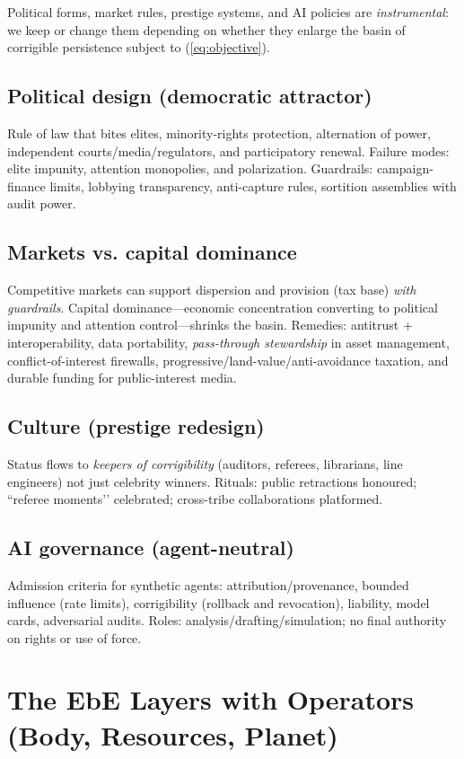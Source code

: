 \documentclass[11pt,a4paper]{article}
\begin{document}
Political forms, market rules, prestige systems, and AI policies are \emph{instrumental}: we keep or change them depending on whether they enlarge the basin of corrigible persistence subject to (\ref{eq:objective}).

\subsection*{Political design (democratic attractor)}
Rule of law that bites elites, minority-rights protection, alternation of power, independent courts/media/regulators, and participatory renewal. Failure modes: elite impunity, attention monopolies, and polarization. Guardrails: campaign-finance limits, lobbying transparency, anti-capture rules, sortition assemblies with audit power.

\subsection*{Markets vs. capital dominance}
Competitive markets can support dispersion and provision (tax base) \emph{with guardrails}. Capital dominance---economic concentration converting to political impunity and attention control---shrinks the basin. Remedies: antitrust + interoperability, data portability, \emph{pass-through stewardship} in asset management, conflict-of-interest firewalls, progressive/land-value/anti-avoidance taxation, and durable funding for public-interest media.

\subsection*{Culture (prestige redesign)}
Status flows to \emph{keepers of corrigibility} (auditors, referees, librarians, line engineers) not just celebrity winners. Rituals: public retractions honoured; “referee moments’’ celebrated; cross-tribe collaborations platformed.

\subsection*{AI governance (agent-neutral)}
Admission criteria for synthetic agents: attribution/provenance, bounded influence (rate limits), corrigibility (rollback and revocation), liability, model cards, adversarial audits. Roles: analysis/drafting/simulation; no final authority on rights or use of force.

\section{The EbE Layers with Operators (Body, Resources, Planet)}
\label{sec:layers}
\end{document}
